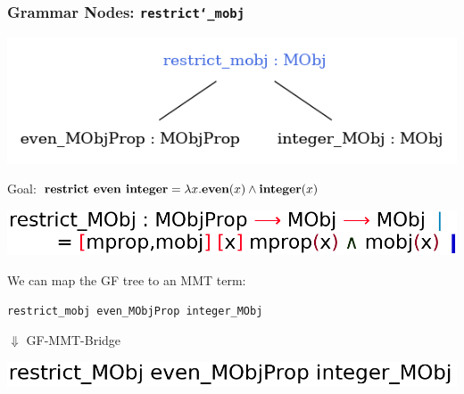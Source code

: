 \documentclass[usenames,dvipsnames,handout]{beamer}
\newcommand{\gfinl}[1]{\lstinline[language=GF]{#1}}
\begin{document}
\begin{frame}[fragile]
    \frametitle{Grammar Nodes: \texttt{\bfseries restrict\char`_mobj } }

    \includegraphics[scale=0.4]{figures/restrict_graph.png}

    \vspace{1.5em}
    Goal: $\text{\bfseries restrict even integer} = \lambda x.\text{\bfseries even}(x) \land \text{\bfseries integer}(x)$

    \pause
    \vspace{1.0em}
    \quad\includegraphics[scale=0.2]{figures/restrict_mmt_def.png}

    \pause
    \vspace{2em}
    We can map the GF tree to an MMT term:

    \vspace{0.5em}
    \gfinl{restrict_mobj even_MObjProp integer_MObj}

    \vspace{0.2em}
    \quad$\Downarrow$ {\tiny GF-MMT-Bridge}
    
    \vspace{0.2em}
    \includegraphics[scale=0.2]{figures/even_int_mmt.png}
\end{frame}
\end{document}
